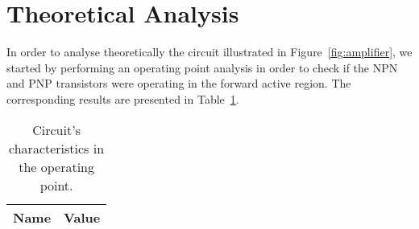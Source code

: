 \section{Theoretical Analysis}
\label{sec:analysis}

In order to analyse theoretically the circuit illustrated in Figure~\ref{fig:amplifier}, we started by performing an operating point analysis in order to check if the NPN and PNP transistors were operating in the forward active region. The corresponding results are presented in Table~\ref{tab:op}. \\

\begin{table}[H]
  \centering
  \begin{tabular}{|l|r|}
    \hline    
    {\bf Name} & {\bf Value} \\ \hline
    
  \end{tabular}
  \caption{Circuit's characteristics in the operating point.}
  \label{tab:op}
\end{table}

